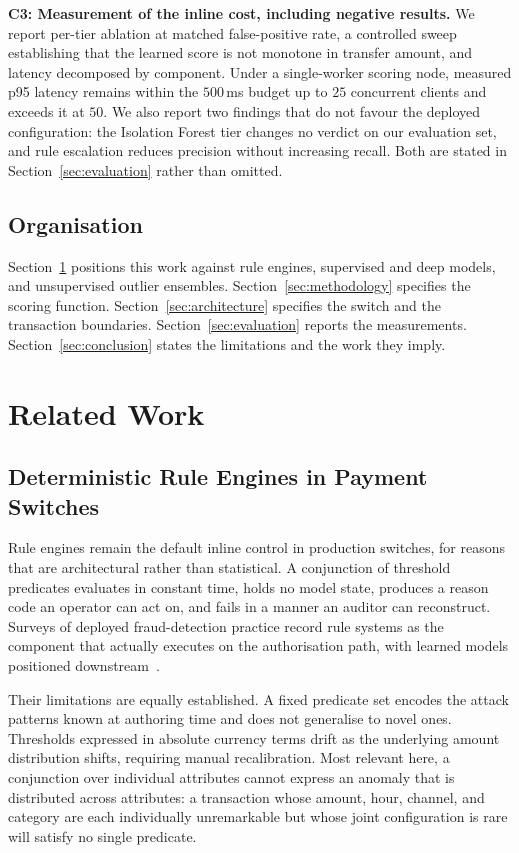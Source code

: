 \documentclass[conference]{IEEEtran}
\begin{document}
\textbf{C3: Measurement of the inline cost, including negative
results.} We report per-tier ablation at matched false-positive rate, a
controlled sweep establishing that the learned score is not monotone in
transfer amount, and latency decomposed by component. Under a
single-worker scoring node, measured p95 latency remains within the
$500$\,ms budget up to $25$ concurrent clients and exceeds it at $50$.
We also report two findings that do not favour the deployed
configuration: the Isolation Forest tier changes no verdict on our
evaluation set, and rule escalation reduces precision without
increasing recall. Both are stated in Section~\ref{sec:evaluation}
rather than omitted.

\subsection{Organisation}
Section~\ref{sec:relatedwork} positions this work against rule engines,
supervised and deep models, and unsupervised outlier ensembles.
Section~\ref{sec:methodology} specifies the scoring function.
Section~\ref{sec:architecture} specifies the switch and the transaction
boundaries. Section~\ref{sec:evaluation} reports the measurements.
Section~\ref{sec:conclusion} states the limitations and the work they
imply.

\section{Related Work}
\label{sec:relatedwork}

\subsection{Deterministic Rule Engines in Payment Switches}
\label{subsec:rw_rules}

Rule engines remain the default inline control in production switches,
for reasons that are architectural rather than statistical. A
conjunction of threshold predicates evaluates in constant time, holds
no model state, produces a reason code an operator can act on, and
fails in a manner an auditor can reconstruct. Surveys of deployed
fraud-detection practice record rule systems as the component that
actually executes on the authorisation path, with learned models
positioned downstream~\cite{abdallah2016}.

Their limitations are equally established. A fixed predicate set
encodes the attack patterns known at authoring time and does not
generalise to novel ones. Thresholds expressed in absolute currency
terms drift as the underlying amount distribution shifts, requiring
manual recalibration. Most relevant here, a conjunction over individual
attributes cannot express an anomaly that is distributed across
attributes: a transaction whose amount, hour, channel, and category are
each individually unremarkable but whose joint configuration is rare
will satisfy no single predicate.
\end{document}
